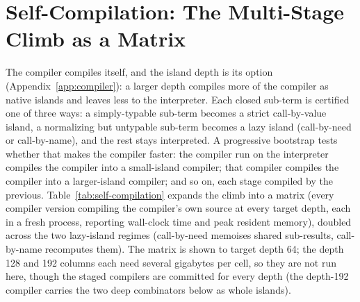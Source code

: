 \section{Self-Compilation: The Multi-Stage Climb as a Matrix}\label{app:benchmark}
The compiler compiles itself, and the island depth is its option (Appendix~\ref{app:compiler}): a larger
depth compiles more of the compiler as native islands and leaves less to the interpreter. Each closed
sub-term is certified one of three ways: a simply-typable sub-term becomes a strict call-by-value island,
a normalizing but untypable sub-term becomes a lazy island (call-by-need or call-by-name), and the rest
stays interpreted. A progressive bootstrap tests whether that makes the compiler faster: the compiler run
on the interpreter compiles the compiler into a small-island compiler; that compiler compiles the
compiler into a larger-island compiler; and so on, each stage compiled by the previous.
Table~\ref{tab:self-compilation} expands the climb into a matrix (every compiler version compiling the
compiler's own source at every target depth, each in a fresh process, reporting wall-clock time and peak
resident memory), doubled across the two lazy-island regimes (call-by-need memoises shared sub-results,
call-by-name recomputes them). The matrix is shown to target depth 64; the depth 128 and 192 columns each
need several gigabytes per cell, so they are not run here, though the staged compilers are committed for
every depth (the depth-192 compiler carries the two deep combinators below as whole islands).

\begin{table}[h]
\centering

\caption{The multi-stage climb as a matrix, doubled across the two lazy-island regimes (call-by-need
memoise and call-by-name recompute): rows are the compiler version doing the compiling (the interpreter,
then the compiler self-compiled at each island depth), columns the target island depth. Within each
regime block the upper tabular is wall-clock time in seconds and the lower is peak resident memory in
gigabytes, each of one fresh process compiling the compiler's own source. The linear bootstrap is the
diagonal.}
\label{tab:self-compilation}
\end{table}

